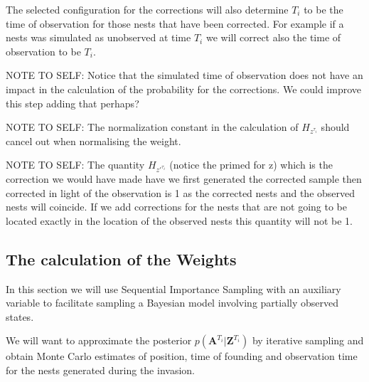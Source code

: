 \documentclass[11pt,a4paper]{article}
\renewcommand{\vec}[1]{\mathbf{#1}}
\begin{document}
{The selected configuration for the corrections will also determine $T_i$ to be the time of observation for those nests that have been corrected. For example if a nests was simulated as unobserved at time $T_i$ we will correct also the time of observation to be $T_i$. 

NOTE TO SELF: Notice that the simulated time of observation does not have an impact in the calculation of the probability for the corrections. We could improve this step adding that perhaps?

NOTE TO SELF: The normalization constant in the calculation of $H_{z^{\tau_i}}$ should cancel out when normalising the weight. 

NOTE TO SELF: The quantity $H_{z'^{\tau_i}}$ (notice the primed for z) which is the correction we would have made have we first generated the corrected sample then corrected in light of the observation is 1 as the corrected nests and the observed nests will coincide. If we add corrections for the nests that are not going to be located exactly in the location of the observed nests this quantity will not be 1.
}

{\color{red}
\subsection{The calculation of the Weights} \label{subsec:weight}

In this section we will use Sequential Importance Sampling with an auxiliary variable to facilitate sampling a Bayesian model involving partially observed states.

We will want to approximate the posterior $p(\vec{A}^{T_i} | \vec{Z}^{T_i})$ by iterative sampling and obtain Monte Carlo estimates of position, time of founding and observation time for the nests generated during the invasion. 





}
\end{document}

